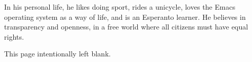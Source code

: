 In his personal life, he likes doing sport, rides a unicycle, loves the Emacs
operating system as a way of life, and is an Esperanto learner. He believes in
transparency and openness, in a free world where all citizens must have equal
rights.

\begin{center}
  \vspace{4ex}
\end{center}


\cleardoublepage{}
\thispagestyle{empty}
\null\vfill
\begin{center}
  \vspace{-2ex}
  This page intentionally left blank.
\end{center}
\vfill\null{}
\null{}


\cleardoublepage{}
\pagestyle{empty}
\null{}



